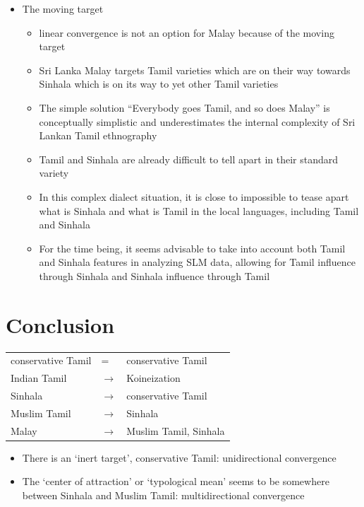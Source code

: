 \documentclass[a4paper,utf8]{article}
\begin{document}
\begin{itemize}
 \item The moving target
  \begin{itemize}
  \item linear convergence is not an option for Malay because of the moving target
  \item Sri Lanka Malay targets Tamil varieties which are on their way towards Sinhala which is on its way to yet other Tamil varieties
  \item The simple solution ``Everybody goes Tamil, and so does Malay'' is conceptually simplistic and underestimates the internal complexity of Sri Lankan Tamil ethnography
  \item Tamil and Sinhala are already difficult to tell apart in their standard variety
  \item In this complex dialect situation, it is close to impossible to tease apart what is Sinhala and what is Tamil in the local languages, including Tamil and Sinhala
  \item For the time being, it seems advisable to take into account both Tamil and Sinhala features in analyzing SLM data, allowing for Tamil influence through Sinhala and Sinhala influence through Tamil
  \end{itemize}
\end{itemize}


\section{Conclusion}
\begin{center}
\begin{tabular}{lll}
conservative Tamil & = & conservative Tamil\\
Indian Tamil & $\to$ & Koineization\\
Sinhala & $\to$ & conservative Tamil\\
Muslim Tamil & $\to$ & Sinhala\\
Malay & $\to$ & Muslim Tamil, Sinhala
\end{tabular}
\end{center}



\begin{itemize}
 \item There is an `inert target', conservative Tamil: unidirectional convergence
 \item The `center of attraction'  or `typological mean'  seems to be somewhere between Sinhala and Muslim Tamil: multidirectional convergence
\end{itemize}
\end{document}

